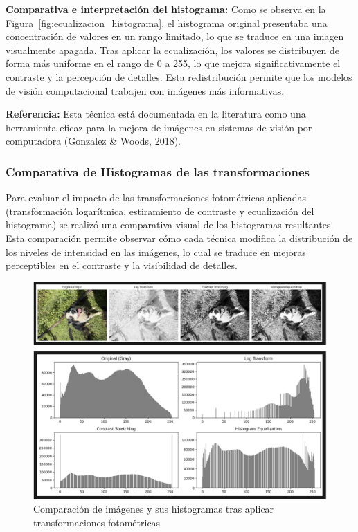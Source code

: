 \documentclass[12pt,letterpaper]{article}
\begin{document}
\textbf{Comparativa e interpretación del histograma:} Como se observa en la Figura~\ref{fig:ecualizacion_histograma}, el histograma original presentaba una concentración de valores en un rango limitado, lo que se traduce en una imagen visualmente apagada. Tras aplicar la ecualización, los valores se distribuyen de forma más uniforme en el rango de 0 a 255, lo que mejora significativamente el contraste y la percepción de detalles. Esta redistribución permite que los modelos de visión computacional trabajen con imágenes más informativas.

\textbf{Referencia:} Esta técnica está documentada en la literatura como una herramienta eficaz para la mejora de imágenes en sistemas de visión por computadora (Gonzalez & Woods, 2018).

\subsubsection{Comparativa de Histogramas de las transformaciones}

Para evaluar el impacto de las transformaciones fotométricas aplicadas (transformación logarítmica, estiramiento de contraste y ecualización del histograma) se realizó una comparativa visual de los histogramas resultantes. Esta comparación permite observar cómo cada técnica modifica la distribución de los niveles de intensidad en las imágenes, lo cual se traduce en mejoras perceptibles en el contraste y la visibilidad de detalles.

\begin{figure}[H]
  \centering
  \includegraphics[width=0.8\linewidth]{figuras/comparacion_transformaciones.png}
  \caption{Comparación de imágenes y sus histogramas tras aplicar transformaciones fotométricas}
  \label{fig:comparacion_transformaciones}
\end{figure}
\end{document}
